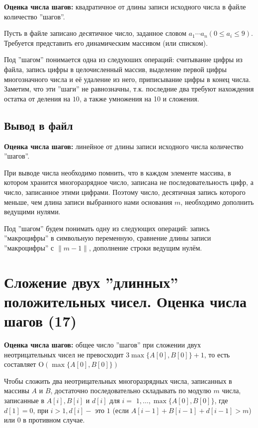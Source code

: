 \documentclass[40pt]{article}
\begin{document}
\textbf{Оценка числа шагов:} квадратичное от длины записи исходного числа в файле количество ''шагов''.

Пусть в файле записано десятичное число, заданное словом $a_{1} \cdots a_{n}\left(0 \leq a_{i} \leq 9\right)$. Требуется представить его динамическим массивом (или списком).

Под ''шагом'' понимается одна из следуюших операций:
считывание цифры из файла, запись цифры в целочисленный массив, выделение первой цифры многозначного числа и её удаление из него, приписывание цифры в конец числа. Заметим, что эти ''шаги'' не равнозначны, т.к. последние два требуют нахождения остатка от деления на $10$, а также умножения на 10 и сложения.

\subsection{Вывод в файл}

\textbf{Оценка числа шагов:} линейное от длины записи исходного числа количество ''шагов''.

При выводе числа необходимо помнить, что в каждом элементе массива, в котором хранится многоразрядное число, записана не последовательность цифр, а число, записанное этими цифрами. Поэтому число, десятичная запись которого меньше, чем длина записи выбранного нами основания $m$, необходимо дополнить ведущими нулями.

Под ''шагом'' будем понимать одну из следующих операций: запись ''макроцифры'' в символьную переменную, сравнение длины записи ''макроцифры'' с $\|m-1\|$, дополнение строки ведущим нулём.



\section{Сложение двух ''длинных'' положительных чисел. Оценка числа шагов (17)}

\textbf{Оценка числа шагов:} общее число ''шагов'' при сложении двух неотрицательных чисел не превосходит $3\max \{A[0], B[0]\}+1$, то есть составляет $\mathrm{O}(\max \{A[0], B[0]\})$

Чтобы сложить два неотрицательных многоразрядных числа, записанных в массивы $A$ и $B$, достаточно последовательно складывать по модулю $m$ числа, записанные в $A[i], B[i]$ и $d[i]$ для $i=$ $1, \ldots, \max \{A[0], B[0]\}$, где $d[1]=0$, при $i>1, d[i]-$ это $1$ (если $A[i-1]+B[i-1]+d[i-1]>m$) или 0 в противном случае.
\end{document}
